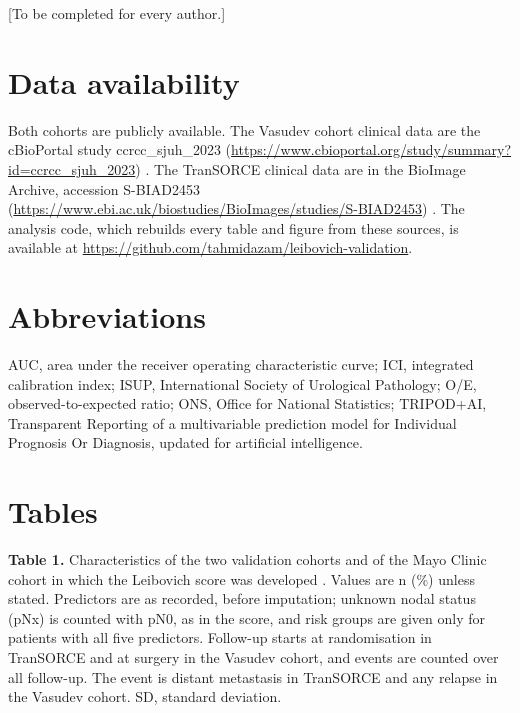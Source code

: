 \documentclass[11pt,a4paper]{article}
\begin{document}
[To be completed for every author.]

\section*{Data availability}

Both cohorts are publicly available.
The Vasudev cohort clinical data are the cBioPortal study ccrcc\_sjuh\_2023 (\url{https://www.cbioportal.org/study/summary?id=ccrcc_sjuh_2023}) \cite{Vasudev_2023}.
The TranSORCE clinical data are in the BioImage Archive, accession S-BIAD2453 (\url{https://www.ebi.ac.uk/biostudies/BioImages/studies/S-BIAD2453}) \cite{Abdullah_2026}.
The analysis code, which rebuilds every table and figure from these sources, is available at \url{https://github.com/tahmidazam/leibovich-validation}.

\section*{Abbreviations}

AUC, area under the receiver operating characteristic curve;
ICI, integrated calibration index;
ISUP, International Society of Urological Pathology;
O/E, observed-to-expected ratio;
ONS, Office for National Statistics;
TRIPOD+AI, Transparent Reporting of a multivariable prediction model for Individual Prognosis Or Diagnosis, updated for artificial intelligence.




\clearpage
\section*{Tables}


\textbf{Table 1.} Characteristics of the two validation cohorts and of the Mayo Clinic cohort in which the Leibovich score was developed \cite{Leibovich_2003}.
Values are n (\%) unless stated.
Predictors are as recorded, before imputation; unknown nodal status (pNx) is counted with pN0, as in the score, and risk groups are given only for patients with all five predictors.
Follow-up starts at randomisation in TranSORCE and at surgery in the Vasudev cohort, and events are counted over all follow-up.
The event is distant metastasis in TranSORCE and any relapse in the Vasudev cohort.
SD, standard deviation.


\end{document}
